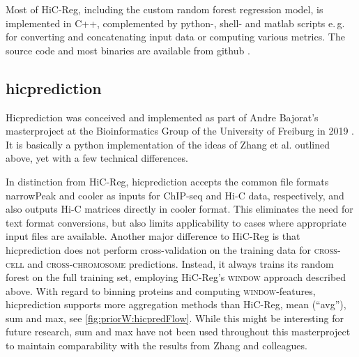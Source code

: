 Most of HiC-Reg, including the custom random forest regression model, is implemented in C++, 
complemented by python-, shell- and matlab scripts e.\,g. for converting and concatenating input data or 
computing various metrics. The source code and most binaries are available from github \cite{Roy2020}.

\subsection{hicprediction}
Hicprediction was conceived and implemented as part of Andre Bajorat's masterproject at the Bioinformatics Group of the University of Freiburg
in 2019 \cite{Bajorat2019}. It is basically a python implementation of the ideas of Zhang et al. outlined above, 
yet with a few technical differences.

In distinction from HiC-Reg, hicprediction accepts the common file formats narrowPeak and cooler \cite{Abdennur2019}
as inputs for ChIP-seq and Hi-C data, respectively, and also outputs Hi-C matrices directly in cooler format.
This eliminates the need for text format conversions, 
but also limits applicability to cases where appropriate input files are available.
Another major difference to HiC-Reg is that hicprediction does not perform cross-validation on the training data
for \textsc{cross-cell} and \textsc{cross-chromosome} predictions.
Instead, it always trains its random forest on the full training set, 
employing HiC-Reg's \textsc{window} approach described above.
With regard to binning proteins and computing \textsc{window}-features, 
hicprediction supports more aggregation methods than HiC-Reg, mean (``avg''), sum and max, see \autoref{fig:priorW:hicpredFlow}.
While this might be interesting for future research, sum and max have not been used throughout this masterproject to
maintain comparability with the results from Zhang and colleagues.

